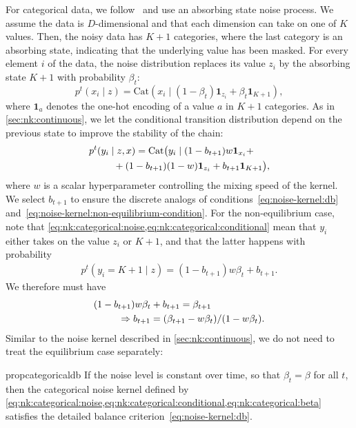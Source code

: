 \documentclass[10pt,twocolumn,letterpaper]{article}
\begin{document}
For categorical data, we follow~\cite{austin2021structured} and use an absorbing state noise process.
We assume the data is $D$-dimensional and that each dimension can take on one of $K$ values.
Then, the noisy data has $K+1$ categories, where the last category is an absorbing state, indicating that the underlying value has been masked.
For every element $i$ of the data, the noise distribution replaces its value $z_{i}$ by the absorbing state $K+1$ with probability $\beta_{t}$:
\begin{equation}
  p^{t}(x_{i} \mid z)
  =
    \text{Cat}\left(
    x_{i} \mid (1 - \beta_{t}) \mathbf{1}_{z_{i}} + \beta_{t} \mathbf{1}_{K+1}
    \right),
    \label{eq:nk:categorical:noise}
\end{equation}
where $\mathbf{1}_{a}$ denotes the one-hot encoding of a value $a$ in $K+1$ categories.
As in \cref{sec:nk:continuous}, we let the conditional transition distribution depend on the previous state to improve the stability of the chain:
\begin{align}
  p^{t}(y_{i} \mid z, x)
  & =
    \text{Cat}\big(
    y_{i} \mid
    (1 - b_{t+1}) w \mathbf{1}_{x_{i}} +
    \nonumber \\
  & \hspace{-0.8cm}
    + (1 - b_{t+1}) (1 - w) \mathbf{1}_{z_{i}} + b_{t+1} \mathbf{1}_{K+1}
    \big),
    \label{eq:nk:categorical:conditional}
\end{align}
where $w$ is a scalar hyperparameter controlling the mixing speed of the kernel.
We select $b_{t+1}$ to ensure the discrete analogs of conditions~\eqref{eq:noise-kernel:db} and~\eqref{eq:noise-kernel:non-equilibrium-condition}.
For the non-equilibrium case, note that \cref{eq:nk:categorical:noise,eq:nk:categorical:conditional} mean that $y_{i}$ either takes on the value $z_{i}$ or $K+1$, and that the latter happens with probability
\begin{align}
  p^{t}(y_{i} = K + 1 \mid z) = (1 - b_{t+1})w \beta_{t} + b_{t+1}.
\end{align}
We therefore must have
\begin{align}
  (1 - b_{t+1})w \beta_{t} + b_{t+1} = \beta_{t+1}
  & \nonumber \\
  & \hspace{-3.4cm} \Rightarrow
    b_{t+1} = (\beta_{t+1} - w \beta_{t}) / (1 - w \beta_{t}).
    \label{eq:nk:categorical:beta}
\end{align}
Similar to the noise kernel described in \cref{sec:nk:continuous}, we do not need to treat the equilibrium case separately:
\begin{restatable}{prop}{categoricaldb}\label{prop:categorical-db}
  If the noise level is constant over time, so that $\beta_{t} = \beta$ for all $t$, then the categorical noise kernel defined by \cref*{eq:nk:categorical:noise,eq:nk:categorical:conditional,eq:nk:categorical:beta} satisfies the detailed balance criterion~\eqref{eq:noise-kernel:db}.
\end{restatable}
\end{document}
